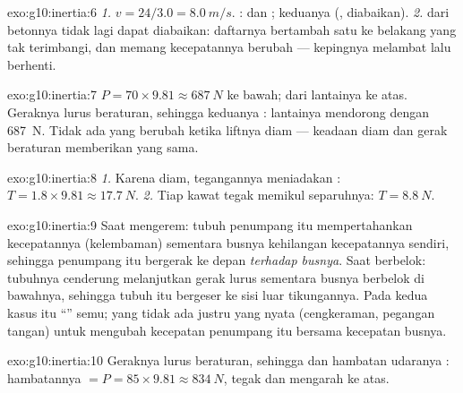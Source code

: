 \begin{solution}{exo:g10:inertia:6}
\emph{1.} $v = 24/3.0 = \qty{8.0}{m/s}$. :  dan ; keduanya  (, 
diabaikan). \emph{2.}  dari betonnya tidak lagi dapat diabaikan:
daftarnya bertambah satu  ke belakang yang tak terimbangi, dan
memang kecepatannya berubah --- kepingnya melambat lalu berhenti.
\end{solution}

\begin{solution}{exo:g10:inertia:7}
 $P = 70 \times 9.81 \approx \qty{687}{N}$ ke bawah;  dari
lantainya ke atas. Geraknya lurus beraturan, sehingga keduanya : lantainya mendorong dengan \qty{687}{N}. Tidak ada yang
berubah ketika liftnya diam --- keadaan diam dan gerak beraturan
memberikan  yang sama.
\end{solution}

\begin{solution}{exo:g10:inertia:8}
\emph{1.} Karena diam, tegangannya meniadakan :
$T = 1.8 \times 9.81 \approx \qty{17.7}{N}$. \emph{2.} Tiap kawat tegak
memikul separuhnya: $T = \qty{8.8}{N}$.
\end{solution}

\begin{solution}{exo:g10:inertia:9}
Saat mengerem: tubuh penumpang itu mempertahankan kecepatannya
(kelembaman) sementara busnya kehilangan kecepatannya sendiri, sehingga
penumpang itu bergerak ke depan \emph{terhadap busnya}. Saat berbelok:
tubuhnya cenderung melanjutkan gerak lurus sementara busnya berbelok di
bawahnya, sehingga tubuh itu bergeser ke sisi luar tikungannya. Pada
kedua kasus itu ``'' semu; yang tidak ada justru  yang nyata
(cengkeraman, pegangan tangan) untuk mengubah kecepatan penumpang itu
bersama kecepatan busnya.
\end{solution}

\begin{solution}{exo:g10:inertia:10}
Geraknya lurus beraturan, sehingga  dan hambatan udaranya : hambatannya $= P = 85 \times 9.81 \approx \qty{834}{N}$,
tegak dan mengarah ke atas.
\end{solution}

